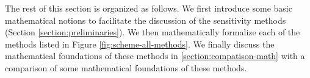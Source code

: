 The rest of this section is organized as follows. 
We first introduce some basic mathematical notions to facilitate the discussion of the sensitivity methods (Section \ref{section:preliminaries}).
We then mathematically formalize each of the methods listed in Figure \ref{fig:scheme-all-methods}.
We finally discuss the mathematical foundations of these methods in \ref{section:compatison-math} with a comparison of some mathematical foundations of these methods. 
